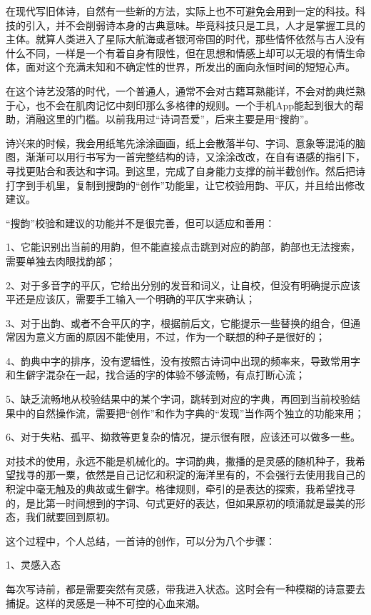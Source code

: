 \documentclass{article}
\begin{document}
在现代写旧体诗，自然有一些新的方法，实际上也不可避免会用到一定的科技。科技的引入，并不会削弱诗本身的古典意味。毕竟科技只是工具，人才是掌握工具的主体。就算人类进入了星际大航海或者银河帝国的时代，那些情怀依然与古人没有什么不同，一样是一个有着自身有限性，但在思想和情感上却可以无垠的有情生命体，面对这个充满未知和不确定性的世界，所发出的面向永恒时间的短短心声。

在这个诗艺没落的时代，一个普通人，通常不会对古籍耳熟能详，不会对韵典烂熟于心，也不会在肌肉记忆中刻印那么多格律的规则。一个手机App能起到很大的帮助，消融这里的门槛。以前我用过``诗词吾爱''，后来主要是用``搜韵''。

诗兴来的时候，我会用纸笔先涂涂画画，纸上会散落半句、字词、意象等混沌的脑图，渐渐可以用行书写为一首完整结构的诗，又涂涂改改，在自有语感的指引下，寻找更贴合和表达和字词。到这里，完成了自身能力支撑的前半截创作。然后把诗打字到手机里，复制到搜韵的``创作''功能里，让它校验用韵、平仄，并且给出修改建议。

``搜韵''校验和建议的功能并不是很完善，但可以适应和善用：

1、它能识别出当前的用韵，但不能直接点击跳到对应的韵部，韵部也无法搜索，需要单独去肉眼找韵部；

2、对于多音字的平仄，它给出分别的发音和词义，让自校，但没有明确提示应该平还是应该仄，需要手工输入一个明确的平仄字来确认；

3、对于出韵、或者不合平仄的字，根据前后文，它能提示一些替换的组合，但通常因为意义方面的原因不能使用，不过，作为一个联想的种子是很好的；

4、韵典中字的排序，没有逻辑性，没有按照古诗词中出现的频率来，导致常用字和生僻字混杂在一起，找合适的字的体验不够流畅，有点打断心流；

5、缺乏流畅地从校验结果中的某个字词，跳转到对应的字典，再回到当前校验结果中的自然操作流，需要把``创作''和作为字典的``发现''当作两个独立的功能来用；

6、对于失粘、孤平、拗救等更复杂的情况，提示很有限，应该还可以做多一些。

对技术的使用，永远不能是机械化的。字词韵典，撒播的是灵感的随机种子，我希望找寻的那一粟，依然是自己记忆和积淀的海洋里有的，不会强行去使用我自己的积淀中毫无触及的典故或生僻字。格律规则，牵引的是表达的探索，我希望找寻的，是比第一时间想到的字词、句式更好的表达，但如果原初的喷涌就是最美的形态，我们就要回到原初。

这个过程中，个人总结，一首诗的创作，可以分为八个步骤：

1、灵感入态

每次写诗前，都是需要突然有灵感，带我进入状态。这时会有一种模糊的诗意要去捕捉。这样的灵感是一种不可控的心血来潮。
\end{document}
